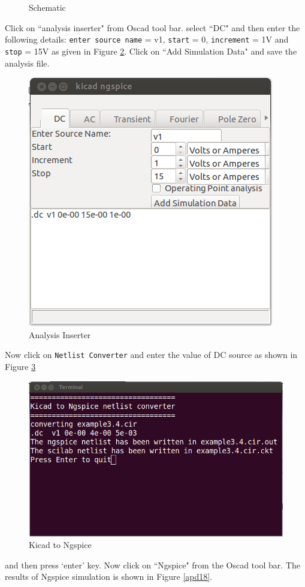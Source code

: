 \begin{figure}
\begin{center}
\caption{Schematic}
\label{apd15}
\end{center}
\end{figure}

Click on ``analysis inserter" from Oscad tool bar.
select ``DC" and then enter the following details:
{\tt enter source name} = v1, {\tt start} = 0, {\tt increment} = 1V and {\tt stop} = 15V as given in Figure \ref{apd16}. Click on ``Add Simulation Data" and save the analysis file. 
\begin{figure}
\begin{center}
\includegraphics[width=0.5\linewidth]{figures/apd16.png}
\caption{Analysis Inserter}
\label{apd16}
\end{center}
\end{figure}
Now click on {\tt Netlist Converter} and enter the value of DC source as shown in Figure \ref{apd17}
\begin{figure}
\begin{center}
\includegraphics[width=0.6\linewidth]{figures/apd17.png}
\caption{Kicad to Ngspice}
\label{apd17}
\end{center}
\end{figure}
and then press `enter' key. Now click on ``Ngspice" from the Oscad tool bar. The results of Ngspice simulation is shown in Figure \ref{apd18}.
